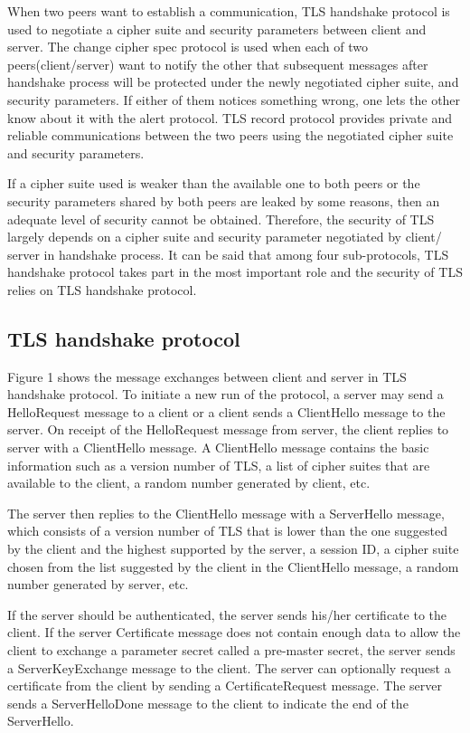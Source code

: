 \documentclass[a4paper,fleqn]{cas-dc}
\begin{document}
When two peers want to establish a communication, TLS handshake protocol is used to negotiate a cipher suite and security parameters between client and server. The change cipher spec protocol is used when each of two peers(client/server) want to notify the other that subsequent messages after handshake process will be protected under the newly negotiated cipher suite,  and security parameters. If either of them notices something wrong, one lets the other know about it with the alert protocol. TLS record protocol provides private and reliable communications between the two peers using the negotiated cipher suite and security parameters.

If a cipher suite used is weaker than the available one to both peers or the security parameters shared by both peers are leaked by some reasons, then an adequate level of security cannot be obtained. Therefore, the security of TLS largely depends on a cipher suite and security parameter negotiated by client/ server in handshake process. It can be said that among four sub-protocols, TLS handshake protocol takes part in the most important role and the security of TLS relies on TLS handshake protocol. 

\subsection{TLS handshake protocol}\label{handshake}
Figure 1 shows the message exchanges between client and server in TLS handshake protocol. 
To initiate a new run of the protocol, a server may send a HelloRequest message to a client or a client sends a ClientHello message to the server. On receipt of the HelloRequest message from server, the client replies to server with a ClientHello message. A ClientHello message contains the basic information such as a version number of TLS, a list of cipher suites that are available to the client, a random number generated by client, etc.

The server then replies to the ClientHello message with a
ServerHello message, which consists of a version number of TLS that is lower than the one suggested by the client and the highest supported by the server, a session ID, a cipher suite chosen from the list suggested by the client in the ClientHello message, a random number generated by server, etc. 

If the server should be authenticated, the server sends  his/her certificate to the client. If the server Certificate message does not contain enough data to allow the client to exchange a parameter secret called a pre-master secret, the server sends a ServerKeyExchange message to the client. The server can optionally request a certificate from the client by sending a CertificateRequest message. The server sends a ServerHelloDone message to the client to indicate the end of the ServerHello.
\end{document}
